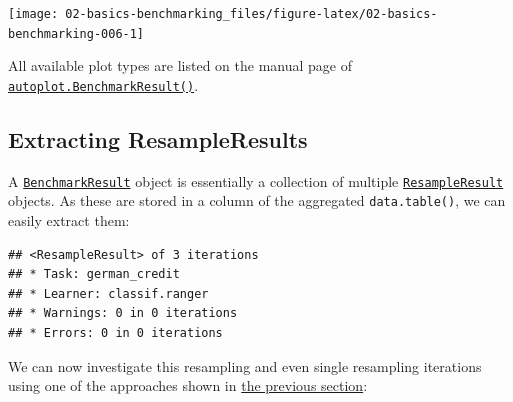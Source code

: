 \documentclass[
]{scrbook}
\newenvironment{Shaded}{\begin{snugshade}}{\end{snugshade}}
\newcommand{\DecValTok}[1]{\textcolor[rgb]{0.00,0.00,0.81}{#1}}
\newcommand{\FunctionTok}[1]{\textcolor[rgb]{0.00,0.00,0.00}{#1}}
\newcommand{\NormalTok}[1]{#1}
\newcommand{\OtherTok}[1]{\textcolor[rgb]{0.56,0.35,0.01}{#1}}
\newcommand{\SpecialCharTok}[1]{\textcolor[rgb]{0.00,0.00,0.00}{#1}}
\newcommand{\StringTok}[1]{\textcolor[rgb]{0.31,0.60,0.02}{#1}}
\renewenvironment{Shaded} {\begin{snugshade}\small} {\end{snugshade}}
\begin{document}
\begin{center}\texttt{[image: 02-basics-benchmarking\_files/figure-latex/02-basics-benchmarking-006-1]} \end{center}

All available plot types are listed on the manual page of \href{https://mlr3viz.mlr-org.com/reference/autoplot.BenchmarkResult.html}{\texttt{autoplot.BenchmarkResult()}}.

\hypertarget{bm-resamp}{%
\subsection{Extracting ResampleResults}\label{bm-resamp}}

A \href{https://mlr3.mlr-org.com/reference/BenchmarkResult.html}{\texttt{BenchmarkResult}} object is essentially a collection of multiple \href{https://mlr3.mlr-org.com/reference/ResampleResult.html}{\texttt{ResampleResult}} objects.
As these are stored in a column of the aggregated \texttt{data.table()}, we can easily extract them:

\begin{Shaded}
\end{Shaded}

\begin{verbatim}
## <ResampleResult> of 3 iterations
## * Task: german_credit
## * Learner: classif.ranger
## * Warnings: 0 in 0 iterations
## * Errors: 0 in 0 iterations
\end{verbatim}

We can now investigate this resampling and even single resampling iterations using one of the approaches shown in \protect\hyperlink{bm-exec}{the previous section}:

\begin{Shaded}
\end{Shaded}
\end{document}
